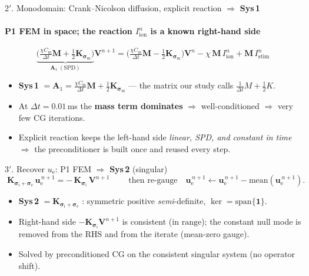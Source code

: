 \documentclass[aspectratio=169,10pt]{beamer}
\newcommand{\ue}{u_{\mathrm e}}
\newcommand{\Iion}{I_{\mathrm{ion}}}
\newcommand{\Istim}{I_{\mathrm{stim}}}
\newcommand{\Cm}{C_{\mathrm m}}
\newcommand{\sm}{\bm\sigma_{\mathrm m}}
\newcommand{\si}{\bm\sigma_{\mathrm i}}
\newcommand{\se}{\bm\sigma_{\mathrm e}}
\newcommand{\Mmat}{\mathbf M}
\newcommand{\Kmat}{\mathbf K}
\newcommand{\Vvec}{\mathbf V}
\newcommand{\uevec}{\mathbf u_{\mathrm e}}
\begin{document}
\begin{frame}{2$'$. Monodomain: Crank--Nicolson diffusion, explicit reaction \;$\Rightarrow$\; \textbf{Sys\,1}}
\framesubtitle{P1 FEM in space; the reaction $\Iion^n$ is a known right-hand side}
\[
\boxed{\;\underbrace{\Big(\tfrac{\chi\Cm}{\Delta t}\Mmat+\tfrac12\Kmat_{\sm}\Big)}_{\textstyle \mathbf A_1\ (\text{SPD})}\Vvec^{n+1}
=\Big(\tfrac{\chi\Cm}{\Delta t}\Mmat-\tfrac12\Kmat_{\sm}\Big)\Vvec^{n}-\chi\,\Mmat\,\Iion^{n}+\Mmat\,\Istim^{n}\;}
\]
\begin{itemize}\itemsep0.3em
  \item \textbf{Sys\,1} $=\mathbf A_1=\tfrac{\chi\Cm}{\Delta t}\Mmat+\tfrac12\Kmat_{\sm}$ --- the matrix our study calls $\tfrac1{\Delta t}M+\tfrac12K$.
  \item At $\Delta t=0.01$\,ms the \textbf{mass term dominates} $\Rightarrow$ well-conditioned $\Rightarrow$ very few CG iterations.
  \item Explicit reaction keeps the left-hand side \emph{linear, SPD, and constant in time} $\Rightarrow$ the preconditioner is built once and reused every step.
\end{itemize}
\end{frame}

\begin{frame}{3$'$. Recover $\ue$: P1 FEM \;$\Rightarrow$\; \textbf{Sys\,2} (singular)}
\[
\boxed{\;\Kmat_{\si+\se}\,\uevec^{\,n+1}=-\,\Kmat_{\si}\,\Vvec^{n+1}\;}
\qquad\text{then re-gauge}\quad \uevec^{\,n+1}\leftarrow \uevec^{\,n+1}-\mathrm{mean}(\uevec^{\,n+1}).
\]
\begin{itemize}\itemsep0.3em
  \item \textbf{Sys\,2} $=\Kmat_{\si+\se}$ : symmetric positive \emph{semi}-definite, $\ker=\mathrm{span}\{\mathbf 1\}$.
  \item Right-hand side $-\Kmat_{\si}\Vvec^{n+1}$ is consistent (in $\mathrm{range}$); the constant null mode is removed from the RHS and from the iterate (mean-zero gauge).
  \item Solved by preconditioned CG on the consistent singular system (no operator shift).
\end{itemize}
\end{frame}
\end{document}

